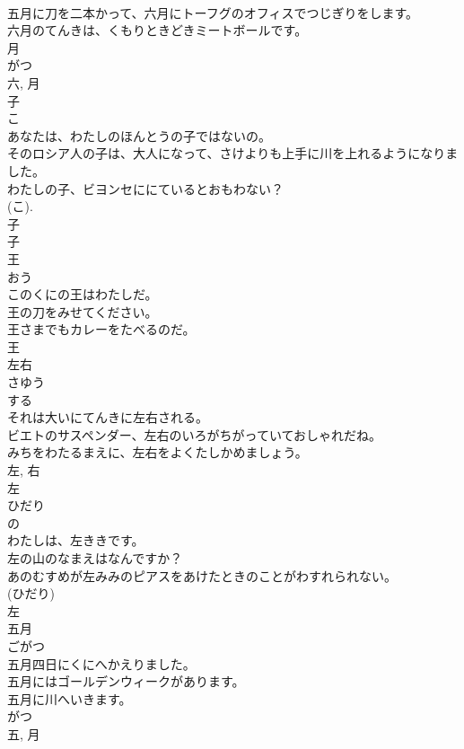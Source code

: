 \documentclass[8pt]{extreport}
\begin{document}
\begin{CJK}{UTF8}{min}
\\	五月に刀を二本かって、六月にトーフグのオフィスでつじぎりをします。	
\\	六月のてんきは、くもりときどきミートボールです。	
\\	月 
\\	がつ 
\\	六, 月	
\\	子	
\\	こ	
\\	あなたは、わたしのほんとうの子ではないの。	
\\	そのロシア人の子は、大人になって、さけよりも上手に川を上れるようになりました。	
\\	わたしの子、ビヨンセににているとおもわない？	
\\	(こ). 
\\	子 
\\	子	
\\	王	
\\	おう	
\\	このくにの王はわたしだ。	
\\	王の刀をみせてください。	
\\	王さまでもカレーをたべるのだ。	
\\	王	
\\	左右	
\\	さゆう	
\\	する 
\\	それは大いにてんきに左右される。	
\\	ビエトのサスペンダー、左右のいろがちがっていておしゃれだね。	
\\	みちをわたるまえに、左右をよくたしかめましょう。	
\\	左, 右	
\\	左	
\\	ひだり	
\\	の 
\\	わたしは、左ききです。	
\\	左の山のなまえはなんですか？	
\\	あのむすめが左みみのピアスをあけたときのことがわすれられない。	
\\	(ひだり) 
\\	左	
\\	五月	
\\	ごがつ	
\\	五月四日にくにへかえりました。	
\\	五月にはゴールデンウィークがあります。	
\\	五月に川へいきます。	
\\	がつ 
\\	五, 月	

\end{CJK}
\end{document}
